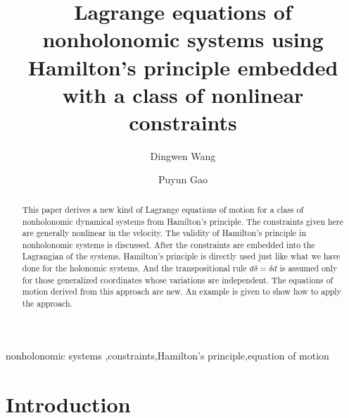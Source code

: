 \documentclass[preprint,11pt]{elsarticle}
\begin{document}
\begin{frontmatter}
\title{Lagrange equations of nonholonomic systems using Hamilton's principle embedded with  a class of nonlinear constraints}
\author[nudt]{Dingwen Wang}
\author[nudt]{Puyun Gao}

\address[nudt]{College of Aerospace Science and Engineering, National University of Defense Technology, Changsha 410072, PR China}

\begin{abstract}
  This paper derives a new kind of Lagrange equations of motion for a
  class of nonholonomic dynamical systems from Hamilton's principle. The constraints given here are generally nonlinear in the velocity.
  The validity of Hamilton's principle in nonholonomic systems is discussed.
  After the constraints are embedded into the Lagrangian of the systems, Hamilton's principle is directly used just like what we have done for the holonomic systems.
  And the transpositional rule $d \delta=\delta d$ is assumed only for those generalized coordinates whose variations are independent.
  The equations of motion derived from this approach are new.
  An example is given to show how to apply the approach.

\end{abstract}

\begin{keyword}
nonholonomic systems \sep constraints\sep Hamilton's principle\sep equation of motion
\end{keyword}
\end{frontmatter}


\section{Introduction}

\end{document}
